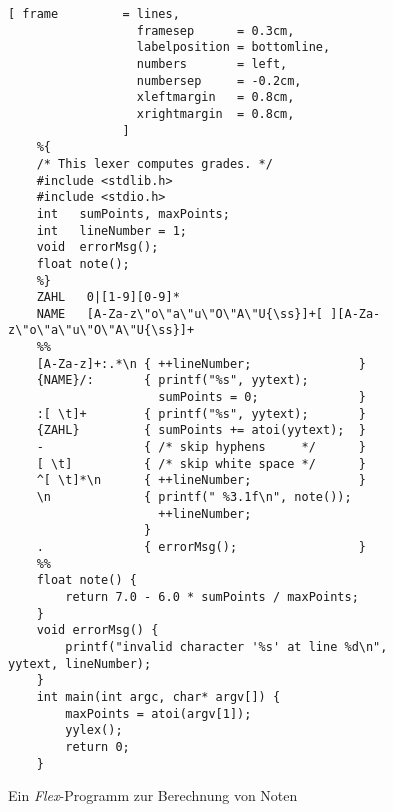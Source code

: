 \begin{figure}[!h]
\centering
\begin{Verbatim}[ frame         = lines, 
                  framesep      = 0.3cm, 
                  labelposition = bottomline,
                  numbers       = left,
                  numbersep     = -0.2cm,
                  xleftmargin   = 0.8cm,
                  xrightmargin  = 0.8cm,
                ]
    %{
    /* This lexer computes grades. */
    #include <stdlib.h>
    #include <stdio.h>
    int   sumPoints, maxPoints;
    int   lineNumber = 1;
    void  errorMsg();
    float note();
    %}    
    ZAHL   0|[1-9][0-9]*
    NAME   [A-Za-z\"o\"a\"u\"O\"A\"U{\ss}]+[ ][A-Za-z\"o\"a\"u\"O\"A\"U{\ss}]+
    %% 
    [A-Za-z]+:.*\n { ++lineNumber;               }
    {NAME}/:       { printf("%s", yytext); 
                     sumPoints = 0;              }
    :[ \t]+        { printf("%s", yytext);       }
    {ZAHL}         { sumPoints += atoi(yytext);  }
    -              { /* skip hyphens     */      }
    [ \t]          { /* skip white space */      }
    ^[ \t]*\n      { ++lineNumber;               }
    \n             { printf(" %3.1f\n", note()); 
                     ++lineNumber;
                   }
    .              { errorMsg();                 }
    %%    
    float note() {
        return 7.0 - 6.0 * sumPoints / maxPoints;
    }
    void errorMsg() {
        printf("invalid character '%s' at line %d\n", yytext, lineNumber); 
    }
    int main(int argc, char* argv[]) {
        maxPoints = atoi(argv[1]);
        yylex();
        return 0;
    }
\end{Verbatim}
\vspace*{-0.3cm}
\caption{Ein \textsl{Flex}-Programm zur Berechnung von Noten}
\label{fig:noten.l}
\end{figure}

